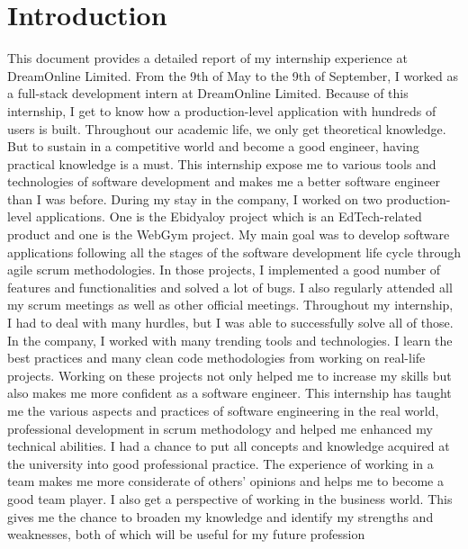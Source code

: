 \setcounter{section}{0} 
\section{Introduction}
\begin{flushleft}
This document provides a detailed report of my internship experience at DreamOnline Limited.
From the 9th of May to the 9th of September, I worked as a full-stack development intern at
DreamOnline Limited. Because of this internship, I get to know how a production-level
application with hundreds of users is built. Throughout our academic life, we only get theoretical
knowledge. But to sustain in a competitive world and become a good engineer, having practical
knowledge is a must. This internship expose me to various tools and technologies of software
development and makes me a better software engineer than I was before.
During my stay in the company, I worked on two production-level applications. One is the
Ebidyaloy project which is an EdTech-related product and one is the WebGym project. My main
goal was to develop software applications following all the stages of the software development
life cycle through agile scrum methodologies. In those projects, I implemented a good number of
features and functionalities and solved a lot of bugs. I also regularly attended all my scrum
meetings as well as other official meetings. Throughout my internship, I had to deal with many
hurdles, but I was able to successfully solve all of those. In the company, I worked with many
trending tools and technologies. I learn the best practices and many clean code methodologies
from working on real-life projects. Working on these projects not only helped me to increase my
skills but also makes me more confident as a software engineer.
This internship has taught me the various aspects and practices of software engineering in the
real world, professional development in scrum methodology and helped me enhanced my
technical abilities. I had a chance to put all concepts and knowledge acquired at the university
into good professional practice. The experience of working in a team makes me more
considerate of others’ opinions and helps me to become a good team player. I also get a
perspective of working in the business world. This gives me the chance to broaden my
knowledge and identify my strengths and weaknesses, both of which will be useful for my future
profession

\vspace{10pt}

\end{flushleft}

